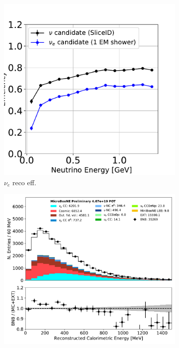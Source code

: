 \documentclass[a4paper]{article}
\begin{document}
\begin{figure}[ht] 
\begin{center}
    \begin{subfigure}[b]{0.3\textwidth}
    \centering
    \includegraphics[width=1.00\textwidth]{nureco/nureco_RUN1.pdf}
    \caption{\label{fig:nuereco:eff} $\nu_e$ reco eff.}
    \end{subfigure}
    \begin{subfigure}[b]{0.31\textwidth}
    \centering
    \includegraphics[width=1.00\textwidth]{nureco/NeutrinoEnergy2_01152020.pdf}

\end{subfigure}
\end{center}
\end{figure}
\end{document}
